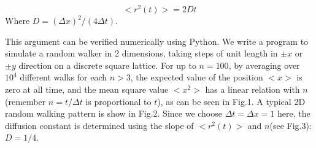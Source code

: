 \documentclass[aps,prl,preprint,superscriptaddress]{revtex4}
\begin{document}
	\begin{equation}
	<r^2(t)> = 2Dt
	\end{equation}
	Where $D = (\Delta x)^2/(4\Delta t)$.
	
	This argument can be verified numerically using Python. We write a program to simulate a random walker in 2 dimensions, taking steps
	of unit length in $\pm x$ or $\pm y$ direction on a discrete square lattice. For up to $n = 100$, by averaging over $10^4$ different walks for each $n > 3$, the expected value of the position $ <x> $ is zero at all time, and the mean square value  $ <x^2> $ has a linear relation with $n$(remember $n =t/\Delta t$ is proportional to $t$), as can be seen in Fig.1. A typical 2D random walking pattern is show in Fig.2. Since we choose $\Delta t = \Delta x = 1$ here, the diffusion constant is determined using the slope of $<r^2(t)>$ and $n$(see Fig.3):$D = 1/4$. 
	
\end{document}
